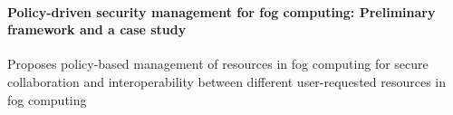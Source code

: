 \paragraph{Policy-driven security management for fog computing: Preliminary framework and a case study} \cite{dsouza_policy-driven_2014}
Proposes policy-based management of resources in fog computing for secure collaboration and interoperability between different user-requested resources in fog computing
